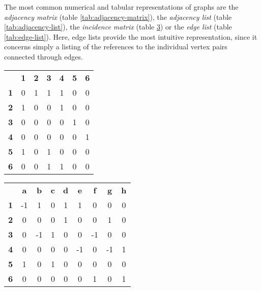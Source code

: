 \documentclass[a4paper, 12pt]{report}
\begin{document}
The most common numerical and tabular representations of graphs are the \textit{adjacency matrix} (table \ref{tab:adjacency-matrix}), the \textit{adjacency list} (table \ref{tab:adjacency-list}), the \textit{incidence matrix} (table \ref{tab:incidence-matrix}) or the \textit{edge list} (table \ref{tab:edge-list}). Here, edge lists provide the most intuitive representation, since it concerns simply a listing of the references to the individual vertex pairs connected through edges.

\begin{table}
\begin{subtable}{0.33\textwidth}\centering
\begin{tabular}{ c c c c c c c }
& \textbf{1} & \textbf{2} & \textbf{3} & \textbf{4} & \textbf{5} & \textbf{6} \\
\textbf{1} & 0 & 1 & 1 & 1 & 0 & 0 \\
\textbf{2} & 1 & 0 & 0 & 1 & 0 & 0 \\
\textbf{3} & 0 & 0 & 0 & 0 & 1 & 0 \\
\textbf{4} & 0 & 0 & 0 & 0 & 0 & 1 \\
\textbf{5} & 1 & 0 & 1 & 0 & 0 & 0 \\
\textbf{6} & 0 & 0 & 1 & 1 & 0 & 0 \\
\end{tabular}
\label{tab:adjacency-matrix}
\end{subtable}
\begin{subtable}{0.41\textwidth}\centering
\begin{tabular}{ c c c c c c c c c }
& \textbf{a} & \textbf{b} & \textbf{c} & \textbf{d} & \textbf{e} & \textbf{f} & \textbf{g} & \textbf{h} \\
\textbf{1} & -1 & 1 & 0 & 1 & 1 & 0 & 0 & 0 \\
\textbf{2} & 0 & 0 & 0 & 1 & 0 & 0 & 1 & 0 \\
\textbf{3} & 0 & -1 & 1 & 0 & 0 & -1 & 0 & 0 \\
\textbf{4} & 0 & 0 & 0 & 0 & -1 & 0 & -1 & 1 \\
\textbf{5} & 1 & 0 & 1 & 0 & 0 & 0 & 0 & 0 \\
\textbf{6} & 0 & 0 & 0 & 0 & 0 & 1 & 0 & 1 \\
\end{tabular}
\label{tab:incidence-matrix}
\end{subtable}
\begin{subtable}{0.24\textwidth}\centering
\begin{tabular}{ c c c c c c c }

\end{tabular}
\end{subtable}
\end{table}
\end{document}
